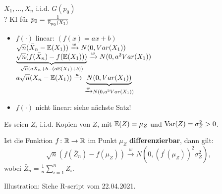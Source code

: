 \documentclass{tstextbook}
\begin{document}
$X_1,...,X_n $ i.i.d. $G(p_0)$\\
? KI für $p_0= \frac{1}{\mathbb E_{p_0}(X_1)}$
\begin{itemize}
    \item $f(\cdot)$ linear: $(f(x)=ax+b)$ \\
        
        $\sqrt{n}(\bar{X}_n -\mathbb E(X_1)) \xrightarrow{w} N(0, Var(X_1)) \\$
        $\underbrace{\sqrt{n}(f(\bar{X}_n) -f(\mathbb E(X_1)))}_{\sqrt{n}(a\bar{X}_n + b -(a\mathbb E(X_1)+b)) } \xrightarrow{w} N(0, a^2 Var(X_1))\\$
        $a\sqrt{n}(\bar{X}_n -\mathbb E(X_1)) \xrightarrow{w} \underbrace{N(0, Var(X_1))}_{\xrightarrow{w} N(0, a^2 Var(X_1)) }$
        

    \item $f(\cdot)$ nicht linear: siehe nächste Satz!
    
\end{itemize}
	

\begin{satz}
	
	Es seien $ Z_i $ i.i.d. Kopien von $ Z $, mit $ \mathbb E(Z) = \mu_Z $ und $ \operatorname{Var}(Z) = \sigma_Z^2 > 0 $. 
	
	Ist die Funktion $ f\colon \mathbb R \rightarrow \mathbb R $ im Punkt $ \mu_Z $ \textbf{differenzierbar}, dann gilt: 
	\[
	\sqrt{n}\left(f(\bar{Z}_n)-f(\mu_Z)\right) \xrightarrow{w} N\left(0, \left(f^\prime \left(\mu_Z\right)\right)^2 \sigma_Z^2 \right), 
	\]
	wobei $ \bar{Z}_n = \frac{1}{n}\sum_{i=1}^{n}Z_i $. \\
\end{satz}

\begin{remark}
	Illustration: Siehe R-script vom 22.04.2021. \\
\end{remark}
\end{document}
